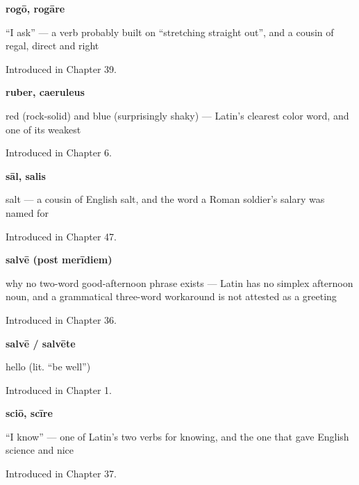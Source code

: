 \noindent\begin{minipage}[t]{\linewidth}
\raggedright
\textbf{rogō, rogāre}\par
\small \textquotedblleft{}I ask\textquotedblright{} — a verb probably built on \textquotedblleft{}stretching straight out\textquotedblright{}, and a cousin of regal, direct and right\par
\footnotesize Introduced in Chapter 39.
\end{minipage}\par\medskip

\noindent\begin{minipage}[t]{\linewidth}
\raggedright
\textbf{ruber, caeruleus}\par
\small red (rock-solid) and blue (surprisingly shaky) — Latin's clearest color word, and one of its weakest\par
\footnotesize Introduced in Chapter 6.
\end{minipage}\par\medskip

\noindent\begin{minipage}[t]{\linewidth}
\raggedright
\textbf{sāl, salis}\par
\small salt — a cousin of English salt, and the word a Roman soldier's salary was named for\par
\footnotesize Introduced in Chapter 47.
\end{minipage}\par\medskip

\noindent\begin{minipage}[t]{\linewidth}
\raggedright
\textbf{salvē (post merīdiem)}\par
\small why no two-word good-afternoon phrase exists — Latin has no simplex afternoon noun, and a grammatical three-word workaround is not attested as a greeting\par
\footnotesize Introduced in Chapter 36.
\end{minipage}\par\medskip

\noindent\begin{minipage}[t]{\linewidth}
\raggedright
\textbf{salvē / salvēte}\par
\small hello (lit. \textquotedblleft{}be well\textquotedblright{})\par
\footnotesize Introduced in Chapter 1.
\end{minipage}\par\medskip

\noindent\begin{minipage}[t]{\linewidth}
\raggedright
\textbf{sciō, scīre}\par
\small \textquotedblleft{}I know\textquotedblright{} — one of Latin's two verbs for knowing, and the one that gave English science and nice\par
\footnotesize Introduced in Chapter 37.
\end{minipage}\par\medskip


